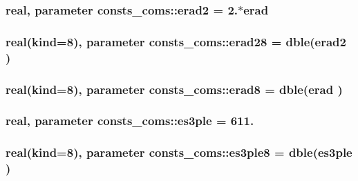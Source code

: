 \subsubsection[{\texorpdfstring{erad2}{erad2}}]{\setlength{\rightskip}{0pt plus 5cm}real, parameter consts\+\_\+coms\+::erad2 = 2.$\ast${\bf erad}}\hypertarget{namespaceconsts__coms_a81a49e39b11ce112f102ddd3dd2c4270}{}\label{namespaceconsts__coms_a81a49e39b11ce112f102ddd3dd2c4270}
\subsubsection[{\texorpdfstring{erad28}{erad28}}]{\setlength{\rightskip}{0pt plus 5cm}real(kind=8), parameter consts\+\_\+coms\+::erad28 = dble({\bf erad2} )}\hypertarget{namespaceconsts__coms_a57037c958a453744e08c3297a5718753}{}\label{namespaceconsts__coms_a57037c958a453744e08c3297a5718753}
\subsubsection[{\texorpdfstring{erad8}{erad8}}]{\setlength{\rightskip}{0pt plus 5cm}real(kind=8), parameter consts\+\_\+coms\+::erad8 = dble({\bf erad} )}\hypertarget{namespaceconsts__coms_abf125d6324bae337a7f09903af9a804e}{}\label{namespaceconsts__coms_abf125d6324bae337a7f09903af9a804e}
\subsubsection[{\texorpdfstring{es3ple}{es3ple}}]{\setlength{\rightskip}{0pt plus 5cm}real, parameter consts\+\_\+coms\+::es3ple = 611.}\hypertarget{namespaceconsts__coms_acce85d2ba9f93e18b505d97bffd4a453}{}\label{namespaceconsts__coms_acce85d2ba9f93e18b505d97bffd4a453}
\subsubsection[{\texorpdfstring{es3ple8}{es3ple8}}]{\setlength{\rightskip}{0pt plus 5cm}real(kind=8), parameter consts\+\_\+coms\+::es3ple8 = dble({\bf es3ple} )}\hypertarget{namespaceconsts__coms_a0296d1fa8ac9a5b8469ab8cc28dc0b1c}{}\label{namespaceconsts__coms_a0296d1fa8ac9a5b8469ab8cc28dc0b1c}
